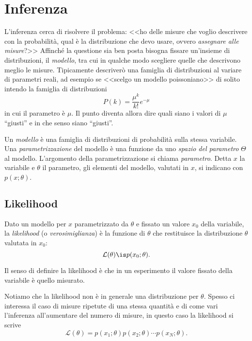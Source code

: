 \chapter{Inferenza}
\label{sec:cap2}

L'inferenza cerca di risolvere il problema:
<<ho delle misure che voglio descrivere con la probabilità,
qual è la distribuzione che devo usare, ovvero \emph{assegnare alle misure}?>>
Affinché la questione sia ben posta bisogna fissare un'insieme di distribuzioni, il \emph{modello},
tra cui in qualche modo scegliere quelle che descrivono meglio le misure.
Tipicamente descriverò una famiglia di distribuzioni al variare di parametri reali,
ad esempio se <<scelgo un modello poissoniano>> di solito intendo la famiglia di distribuzioni
\begin{equation*}
	P(k) = \frac{\mu^k}{k!}e^{-\mu}
\end{equation*}
in cui il parametro è $\mu$.
Il punto diventa allora dire quali siano i valori di $\mu$ ``giusti'' e in che senso siano ``giusti''.

\begin{definition}[Modello]
	Un \emph{modello} è una famiglia di distribuzioni di probabilità sulla stessa variabile.
	Una \emph{parametrizzazione} del modello è una funzione
	da uno \emph{spazio del parametro} $\Theta$
	al modello.
	L'argomento della parametrizzazione si chiama \emph{parametro}.
	Detta $x$ la variabile e $\theta$ il parametro,
	gli elementi del modello, valutati in $x$, si indicano con $p(x;\theta)$.
\end{definition}

\section{Likelihood}

\begin{definition}[Likelihood]
	Dato un modello per $x$ parametrizzato da $\theta$
	e fissato un valore $x_0$ della variabile,
	la \emph{likelihood} (o \emph{verosimiglianza}) è la funzione di $\theta$
	che restituisce la distribuzione $\theta$ valutata in $x_0$:
	\begin{equation*}
		\mathcal L(\theta) \is p(x_0;\theta).
	\end{equation*}
\end{definition}

Il senso di definire la likelihood
è che in un esperimento il valore fissato della variabile è quello misurato.

Notiamo che la likelihood non è in generale una distribuzione per $\theta$.
Spesso ci interessa il caso di misure ripetute di una stessa quantità e di come vari l'inferenza all'aumentare del numero di misure, in questo caso la likelihood si scrive
\begin{equation*}
	\mathcal L(\theta) = p(x_1;\theta) p(x_2;\theta) \dotsm p(x_N;\theta).
\end{equation*}

